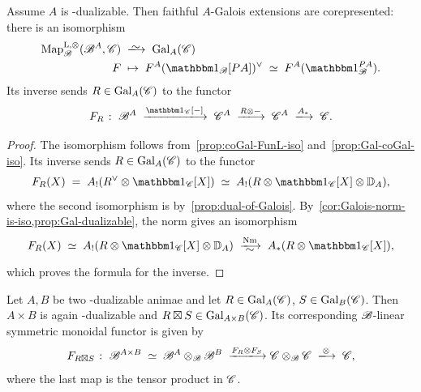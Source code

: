 \documentclass[english,svgnames,table]{article}
\begin{document}
    \begin{theorem}
    \label{thm:Galois-corepresented}
        Assume $A$ is \COB-dualizable. 
        Then faithful $A$-Galois extensions are corepresented: there is an isomorphism
        \begin{equation*}
            \begin{split}
                \MapBo(\basecat^A, \cC) & \;\isotoo\; \Gal_A(\cC) \\
                F & \;\mapsto\; F^A(\ounit_{\basecat}[\Path A])\dual \;\simeq\; F^A(\ounit_{\basecat}^{\Path A}).
            \end{split}
        \end{equation*}
        Its inverse sends $R \in \mathrm{Gal}_A(\mathscr{C})$ to the functor
        \begin{equation*}
            F_R \;\colon\; \basecat^A \;\xtoo{\ounit_{\cC}[-]}\; \cC^A \;\xtoo{R\otimes -}\; \cC^A \;\xtoo{A_*}\; \cC.
        \end{equation*}
    \end{theorem}
    \begin{proof}
        The isomorphism follows from~\cref{prop:coGal-FunL-iso} and~\cref{prop:Gal-coGal-iso}. Its inverse sends $R \in \mathrm{Gal}_A(\mathscr{C})$ to the functor
        \begin{equation*}
            F_R(X) \;=\; A_!(R\dual \otimes \ounit_{\cC}[X]) \;\simeq\; A_!(R \otimes \ounit_{\cC}[X] \otimes \DD_A),
        \end{equation*}
        where the second isomorphism is by~\cref{prop:dual-of-Galois}.
        By~\cref{cor:Galois-norm-is-iso,prop:Gal-dualizable}, the norm gives an isomorphism
        \begin{equation*}
            F_R(X) \;\simeq\; A_!(R \otimes \ounit_{\cC}[X] \otimes \DD_A) \;\xisotoo{\Nm}\; A_*(R \otimes \ounit_{\cC}[X]),
        \end{equation*}
        which proves the formula for the inverse.
    \end{proof}

    \begin{example}
    \label{exm:tensor-of-two-galois-extensions}
        Let $A,B$ be two \COB-dualizable animae and let $R \in \mathrm{Gal}_A(\mathscr{C})$, $S \in \mathrm{Gal}_B(\mathscr{C})$. Then $A \times B$ is again \COB-dualizable and $R \boxtimes S \in \mathrm{Gal}_{A \times B}(\mathscr{C})$. Its corresponding $\mathscr{B}$-linear symmetric monoidal functor is given by
        \begin{equation*}
            F_{R \boxtimes S} \;\colon\; \basecat^{A \times B} \;\simeq\; \basecat^A \otimes_{\basecat} \basecat^B \;\xtoo{F_R \otimes F_S} \cC \otimes_{\basecat} \cC \;\xtoo{\otimes}\; \cC,
        \end{equation*}
        where the last map is the tensor product in $\mathscr{C}$.
    \end{example}
\end{document}
